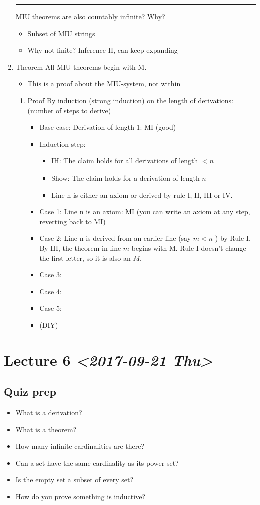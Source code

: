 \documentclass[11pt]{article}
\begin{document}
\begin{enumerate}
\noindent\rule{\textwidth}{0.5pt}
MIU theorems are also countably infinite? Why?
\begin{itemize}
\item Subset of MIU strings
\item Why not finite? Inference II, can keep expanding
\end{itemize}
\item Theorem
\label{sec:orgdcc83e6}
All MIU-theorems begin with M.
\begin{itemize}
\item This is a proof about the MIU-system, not within
\end{itemize}
\begin{enumerate}
\item Proof
\label{sec:org0631037}
By induction (strong induction) on the length of derivations: (number of steps to derive)
\begin{itemize}
\item Base case: Derivation of length 1: MI (good)
\item Induction step:
\begin{itemize}
\item IH: The claim holds for all derivations of length \(<n\)
\item Show: The claim holds for a derivation of length \(n\)
\item Line n is either an axiom or derived by rule I, II, III or IV.
\end{itemize}
\item Case 1: Line n is an axiom: MI (you can write an axiom at any step, reverting back to MI)
\item Case 2: Line n is derived from an earlier line (say \(m<n\) ) by Rule I. By IH, the theorem in line \(m\) begins with M. Rule I doesn't change the first letter, so it is also an \(M\).
\item Case 3:
\item Case 4:
\item Case 5:
\item (DIY)
\end{itemize}
\end{enumerate}
\end{enumerate}
\section{Lecture 6 \textit{<2017-09-21 Thu>}}
\label{sec:org68fd4db}
\subsection{Quiz prep}
\label{sec:org67c7a96}
\begin{itemize}
\item What is a derivation?
\item What is a theorem?
\item How many infinite cardinalities are there?
\item Can a set have the same cardinality as its power set?
\item Is the empty set a subset of every set?
\item How do you prove something is inductive?
\end{itemize}
\end{document}
